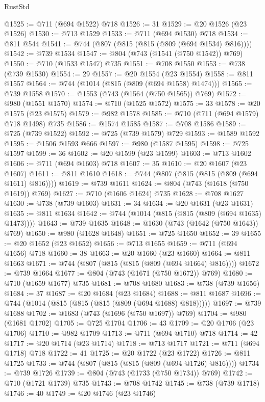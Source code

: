 \begin{lexlean}{RustStd}
\begin{coremodule}
@1525 := @711 (@694 @1522) @718
@1526 := 31
@1529 := @20 @1526 (@23 @1526)
@1530 := @713 @1529
@1533 := @711 (@694 @1530) @718
@1534 := @811 @544
@1541 := @744 (@807 (@815 (@815 (@809 (@694 @1534) @816))))
@1542 := @739 @1534
@1547 := @804 (@743 (@1541 (@750 @1542)) @769)
@1550 := @710 (@1533 @1547) @735
@1551 := @708 @1550
@1553 := @738 (@739 @1530)
@1554 := 29
@1557 := @20 @1554 (@23 @1554)
@1558 := @811 @1557
@1564 := @744 (@1014 (@815 (@809 (@694 @1558) @1474)))
@1565 := @739 @1558
@1570 := @1553 (@743 (@1564 (@750 @1565)) @769)
@1572 := @980 (@1551 @1570)
@1574 := @710 (@1525 @1572)
@1575 := 33
@1578 := @20 @1575 (@23 @1575)
@1579 := @982 @1578
@1585 := @710 (@711 (@694 @1579) @718 @1498) @735
@1586 := @1574 @1585
@1587 := @708 @1586
@1589 := @725 (@739 @1522)
@1592 := @725 (@739 @1579) @729
@1593 := @1589 @1592
@1595 := @1506 @1593 @666
@1597 := @980 (@1587 @1595)
@1598 := @725 @1597
@1599 := 36
@1602 := @20 @1599 (@23 @1599)
@1603 := @713 @1602
@1606 := @711 (@694 @1603) @718
@1607 := 35
@1610 := @20 @1607 (@23 @1607)
@1611 := @811 @1610
@1618 := @744 (@807 (@815 (@815 (@809 (@694 @1611) @816))))
@1619 := @739 @1611
@1624 := @804 (@743 (@1618 (@750 @1619)) @769)
@1627 := @710 (@1606 @1624) @735
@1628 := @708 @1627
@1630 := @738 (@739 @1603)
@1631 := 34
@1634 := @20 @1631 (@23 @1631)
@1635 := @811 @1634
@1642 := @744 (@1014 (@815 (@815 (@809 (@694 @1635) @1473))))
@1643 := @739 @1635
@1648 := @1630 (@743 (@1642 (@750 @1643)) @769)
@1650 := @980 (@1628 @1648)
@1651 := @725 @1650
@1652 := 39
@1655 := @20 @1652 (@23 @1652)
@1656 := @713 @1655
@1659 := @711 (@694 @1656) @718
@1660 := 38
@1663 := @20 @1660 (@23 @1660)
@1664 := @811 @1663
@1671 := @744 (@807 (@815 (@815 (@809 (@694 @1664) @816))))
@1672 := @739 @1664
@1677 := @804 (@743 (@1671 (@750 @1672)) @769)
@1680 := @710 (@1659 @1677) @735
@1681 := @708 @1680
@1683 := @738 (@739 @1656)
@1684 := 37
@1687 := @20 @1684 (@23 @1684)
@1688 := @811 @1687
@1696 := @744 (@1014 (@815 (@815 (@815 (@809 (@694 @1688) @818)))))
@1697 := @739 @1688
@1702 := @1683 (@743 (@1696 (@750 @1697)) @769)
@1704 := @980 (@1681 @1702)
@1705 := @725 @1704
@1706 := 43
@1709 := @20 @1706 (@23 @1706)
@1710 := @982 @1709
@1713 := @711 (@694 @1710) @718
@1714 := 42
@1717 := @20 @1714 (@23 @1714)
@1718 := @713 @1717
@1721 := @711 (@694 @1718) @718
@1722 := 41
@1725 := @20 @1722 (@23 @1722)
@1726 := @811 @1725
@1733 := @744 (@807 (@815 (@815 (@809 (@694 @1726) @816))))
@1734 := @739 @1726
@1739 := @804 (@743 (@1733 (@750 @1734)) @769)
@1742 := @710 (@1721 @1739) @735
@1743 := @708 @1742
@1745 := @738 (@739 @1718)
@1746 := 40
@1749 := @20 @1746 (@23 @1746)

\end{coremodule}
\end{lexlean}
